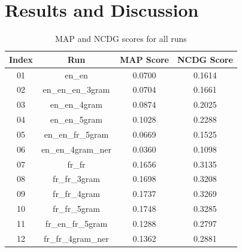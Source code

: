 \section{Results and Discussion}
\label{sec:results}

\begin{table}
    \begin{center}
        \caption{MAP and NCDG scores for all runs}
        \label{tab:all_scores}
        \begin{tabular}{|c|c||c|c|} 
            \hline
            \textbf{Index} & \textbf{Run} & \textbf{MAP Score} & \textbf{NCDG Score}\\
            \hline\hline
            01 & en\_en & \cellcolor{red!30!white}0.0700 & \cellcolor{red!30!white}0.1614 \\
            \hline
            02 & en\_en\_en\_3gram & 0.0704 & 0.1661 \\
            \hline
            03 & en\_en\_4gram & 0.0874 & 0.2025 \\
            \hline
            04 & en\_en\_5gram & 0.1028 & 0.2288 \\
            \hline
            05 & en\_en\_fr\_5gram & \cellcolor{red!60!white}0.0669 & \cellcolor{red!60!white}0.1525 \\
            \hline
            06 & en\_en\_4gram\_ner & \cellcolor{red}0.0360 & \cellcolor{red}0.1098 \\
            \hline
            07 & fr\_fr & 0.1656 & 0.3135 \\
            \hline
            08 & fr\_fr\_3gram & \cellcolor{green!30!white}0.1698 & \cellcolor{green!30!white}0.3208 \\
            \hline
            09 & fr\_fr\_4gram & \cellcolor{green!60!white}0.1737 & \cellcolor{green!60!white}0.3269 \\
            \hline
            10 & fr\_fr\_5gram & \cellcolor{green}0.1748 & \cellcolor{green}0.3285 \\
            \hline
            11 & fr\_en\_fr\_5gram & 0.1288 & 0.2797 \\
            \hline
            12 & fr\_fr\_4gram\_ner & 0.1362 & 0.2881 \\
            \hline
        \end{tabular}
    \end{center}
\end{table}

